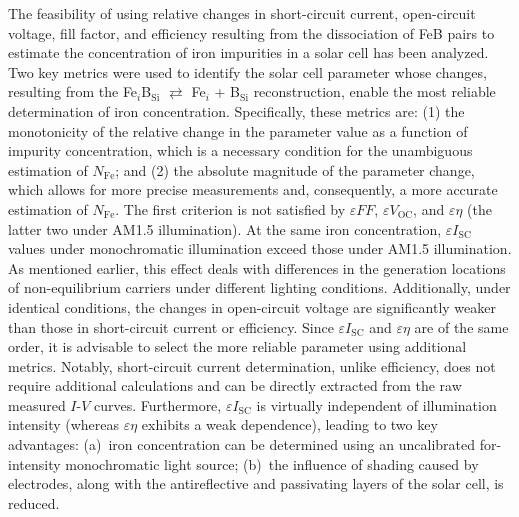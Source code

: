 \documentclass[a4paper,fleqn]{cas-sc}
\begin{document}
\begin{mdframed}
The feasibility of using relative changes in short-circuit current, open-circuit voltage,
fill factor, and efficiency resulting from the dissociation of FeB pairs
to estimate the concentration of iron impurities in a solar cell has been analyzed.
\textcolor[rgb]{1.00,0.07,0.00}{Two key metrics were used to identify the solar cell parameter whose changes,
resulting from the Fe$_i$B$_\mathrm{Si}$ $\rightleftarrows$ Fe$_i$ + B$_\mathrm{Si}$ reconstruction,
enable the most reliable determination of iron concentration.
Specifically, these metrics are:
(1) the monotonicity of the relative change in the parameter value as a function of impurity concentration,
which is a necessary condition for the unambiguous estimation of $N_\mathrm{Fe}$;
and (2) the absolute magnitude of the parameter change, which allows for more precise measurements and,
consequently, a more accurate estimation of $N_\mathrm{Fe}$.
The first criterion is not satisfied by $\varepsilon F\!F$, $\varepsilon V_\mathrm{OC}$, and $\varepsilon \eta$
(the latter two under AM1.5 illumination).
At the same iron concentration, $\varepsilon I_\mathrm{SC}$ values under monochromatic illumination exceed those under AM1.5 illumination.
As mentioned earlier, this effect deals with differences in the generation locations
of non-equilibrium carriers under different lighting conditions.
Additionally, under identical conditions, the changes in open-circuit voltage are significantly weaker
than those in short-circuit current or efficiency.
Since $\varepsilon I_\mathrm{SC}$ and $\varepsilon \eta$ are of the same order,
it is advisable to select the more reliable parameter using additional metrics.
Notably, short-circuit current determination, unlike efficiency, does not require additional calculations
and can be directly extracted from the raw measured $I$-$V$ curves.
Furthermore, $\varepsilon I_\mathrm{SC}$ is virtually independent of illumination intensity
(whereas $\varepsilon \eta$ exhibits a weak dependence), leading to two key advantages:
(a)~iron concentration can be determined using an uncalibrated for-intensity monochromatic light source;
(b)~the influence of shading caused by electrodes, along with the antireflective and passivating layers of the solar cell, is reduced.}


\end{mdframed}
\end{document}

